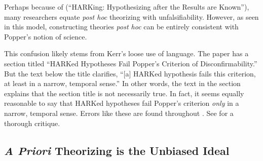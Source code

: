 \documentclass[12pt,english]{article}
\theoremstyle{plain}
\theoremstyle{plain}
\begin{document}
Perhaps because of \citet{kerr1998harking} (``HARKing: Hypothesizing after the Results are Known''), many researchers equate \emph{post hoc} theorizing with unfalsifiability. However, as seen in this model, constructing theories \emph{post hoc} can be entirely consistent with Popper's notion of science. 

This confusion likely stems from Kerr's loose use of language. The paper has a section titled  ``HARKed Hypotheses Fail Popper's Criterion of Disconfirmability.'' But the text below the title clarifies, ``[a] HARKed hypothesis fails this criterion, at least in a narrow, temporal sense.'' In other words, the text in the section explains that the section title is not necessarily true. In fact, it seems equally reasonable to say that HARKed hypotheses fail Popper's criterion \emph{only} in a narrow, temporal sense.  Errors like these are found throughout \citet{kerr1998harking}. See \citet{rubin2022costs} for a thorough critique.



\subsection{\emph{A Priori} Theorizing is the Unbiased Ideal}
\end{document}
